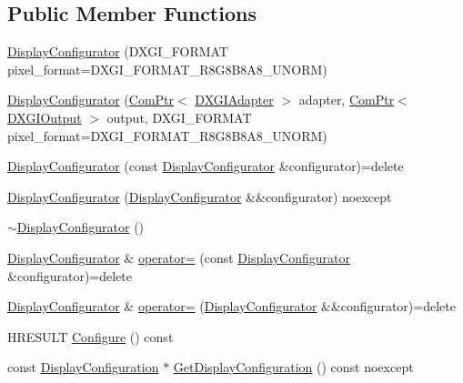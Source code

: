 \subsection*{Public Member Functions}
\begin{DoxyCompactItemize}
\item 
\hyperlink{classmage_1_1rendering_1_1_display_configurator_a533ffee38e3930c1d27db3891ffe8c16}{Display\+Configurator} (D\+X\+G\+I\+\_\+\+F\+O\+R\+M\+AT pixel\+\_\+format=D\+X\+G\+I\+\_\+\+F\+O\+R\+M\+A\+T\+\_\+\+R8\+G8\+B8\+A8\+\_\+\+U\+N\+O\+RM)
\item 
\hyperlink{classmage_1_1rendering_1_1_display_configurator_aa76c3bb137954b7c0deb1d80d1050638}{Display\+Configurator} (\hyperlink{namespacemage_ae74f374780900893caa5555d1031fd79}{Com\+Ptr}$<$ \hyperlink{namespacemage_1_1rendering_ad55e028ebd705b547eeb972ad8d03b6a}{D\+X\+G\+I\+Adapter} $>$ adapter, \hyperlink{namespacemage_ae74f374780900893caa5555d1031fd79}{Com\+Ptr}$<$ \hyperlink{namespacemage_1_1rendering_aaf22d3893277a4bd8497f6ea69b01532}{D\+X\+G\+I\+Output} $>$ output, D\+X\+G\+I\+\_\+\+F\+O\+R\+M\+AT pixel\+\_\+format=D\+X\+G\+I\+\_\+\+F\+O\+R\+M\+A\+T\+\_\+\+R8\+G8\+B8\+A8\+\_\+\+U\+N\+O\+RM)
\item 
\hyperlink{classmage_1_1rendering_1_1_display_configurator_aa1c3dbea2453d12d3478db4724c78728}{Display\+Configurator} (const \hyperlink{classmage_1_1rendering_1_1_display_configurator}{Display\+Configurator} \&configurator)=delete
\item 
\hyperlink{classmage_1_1rendering_1_1_display_configurator_ac75dae1c4df34dda067f1a5d99fdfefa}{Display\+Configurator} (\hyperlink{classmage_1_1rendering_1_1_display_configurator}{Display\+Configurator} \&\&configurator) noexcept
\item 
\hyperlink{classmage_1_1rendering_1_1_display_configurator_a5ccba8cd97da75a7d1c425731fb848d4}{$\sim$\+Display\+Configurator} ()
\item 
\hyperlink{classmage_1_1rendering_1_1_display_configurator}{Display\+Configurator} \& \hyperlink{classmage_1_1rendering_1_1_display_configurator_affd6a3486be8564246628a6a20518ac2}{operator=} (const \hyperlink{classmage_1_1rendering_1_1_display_configurator}{Display\+Configurator} \&configurator)=delete
\item 
\hyperlink{classmage_1_1rendering_1_1_display_configurator}{Display\+Configurator} \& \hyperlink{classmage_1_1rendering_1_1_display_configurator_afa750c6d058e2298dd6bb9cf44d54f06}{operator=} (\hyperlink{classmage_1_1rendering_1_1_display_configurator}{Display\+Configurator} \&\&configurator)=delete
\item 
H\+R\+E\+S\+U\+LT \hyperlink{classmage_1_1rendering_1_1_display_configurator_abeafddcb31aea4ee7235ca5509f1b321}{Configure} () const
\item 
const \hyperlink{classmage_1_1rendering_1_1_display_configuration}{Display\+Configuration} $\ast$ \hyperlink{classmage_1_1rendering_1_1_display_configurator_a5b0440099e3e31977ffaf8072c9fb33f}{Get\+Display\+Configuration} () const noexcept
\end{DoxyCompactItemize}
